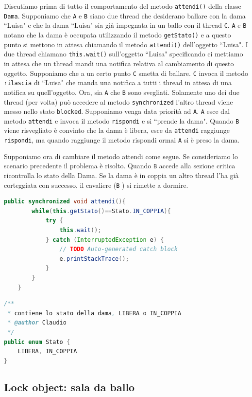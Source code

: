 \documentclass{article}
\begin{document}
Discutiamo prima di tutto il comportamento del metodo \texttt{attendi()} della classe \texttt{Dama}. Supponiamo che \texttt{A} e \texttt{B} siano due thread che desiderano ballare con la dama ``Luisa" e che la dama ``Luisa" sia gi\`a impegnata in un ballo con il thread \texttt{C}. \texttt{A} e \texttt{B} notano che la dama \`e occupata utilizzando il metodo \texttt{getStato()} e a questo punto si mettono in attesa chiamando il metodo \texttt{attendi()} dell'oggetto ``Luisa". I due thread chiamano \texttt{this.wait()} sull'oggetto ``Luisa" specificando ci mettiamo in attesa che un thread mandi una notifica relativa al cambiamento di questo oggetto. Supponiamo che a un certo punto \texttt{C} smetta di ballare. \texttt{C} invoca il metodo \texttt{rilascia} di ``Luisa" che manda una notifica a tutti i thread in attesa di una notifica su quell'oggetto. Ora, sia \texttt{A} che \texttt{B} sono svegliati. Solamente uno dei due thread (per volta)  pu\`o accedere al metodo \texttt{synchronized} l'altro thread viene messo nello stato \texttt{blocked}. Supponiamo venga data priorit\`a ad \texttt{A}. \texttt{A} esce dal metodo \texttt{attendi} e invoca il metodo \texttt{rispondi} e si ``prende la dama". Quando \texttt{B} viene risvegliato \`e convinto che la dama \`e libera, esce da \texttt{attendi} raggiunge \texttt{rispondi}, ma quando raggiunge il metodo rispondi ormai \texttt{A} si \`e preso la dama.

 
Supponiamo ora di cambiare il metodo attendi come segue. Se consideriamo lo scenario precedente il problema \`e risolto. Quando \texttt{B} accede alla sezione critica ricontrolla lo stato della Dama. Se la dama \`e in coppia un altro thread l'ha gi\`a corteggiata con successo, il cavaliere (\texttt{B} ) si rimette a dormire.
\begin{lstlisting}[language=Java]
public synchronized void attendi(){
		while(this.getStato()==Stato.IN_COPPIA){
			try {
				this.wait();
			} catch (InterruptedException e) {
				// TODO Auto-generated catch block
				e.printStackTrace();
			}
		}
	}
\end{lstlisting}

\begin{lstlisting}[language=Java]
/**
 * contiene lo stato della dama, LIBERA o IN_COPPIA
 * @author Claudio
 */
public enum Stato {
	LIBERA, IN_COPPIA
}
\end{lstlisting}

\subsection{Lock object: sala da ballo}
\end{document}
